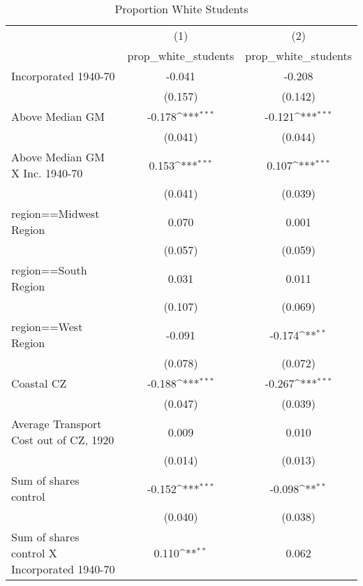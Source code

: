 \begin{table}[htbp]\centering
\def\sym#1{\ifmmode^{#1}\else\(^{#1}\)\fi}
\caption{Proportion White Students}
\begin{tabular}{l*{2}{c}}
\hline\hline
                    &\multicolumn{1}{c}{(1)}&\multicolumn{1}{c}{(2)}\\
                    &\multicolumn{1}{c}{prop\_white\_students}&\multicolumn{1}{c}{prop\_white\_students}\\
\hline
Incorporated 1940-70&      -0.041         &      -0.208         \\
                    &     (0.157)         &     (0.142)         \\
[1em]
Above Median GM     &      -0.178\sym{***}&      -0.121\sym{***}\\
                    &     (0.041)         &     (0.044)         \\
[1em]
Above Median GM X Inc. 1940-70&       0.153\sym{***}&       0.107\sym{***}\\
                    &     (0.041)         &     (0.039)         \\
[1em]
region==Midwest Region&       0.070         &       0.001         \\
                    &     (0.057)         &     (0.059)         \\
[1em]
region==South Region&       0.031         &       0.011         \\
                    &     (0.107)         &     (0.069)         \\
[1em]
region==West Region &      -0.091         &      -0.174\sym{**} \\
                    &     (0.078)         &     (0.072)         \\
[1em]
Coastal CZ          &      -0.188\sym{***}&      -0.267\sym{***}\\
                    &     (0.047)         &     (0.039)         \\
[1em]
Average Transport Cost out of CZ, 1920&       0.009         &       0.010         \\
                    &     (0.014)         &     (0.013)         \\
[1em]
Sum of shares control&      -0.152\sym{***}&      -0.098\sym{**} \\
                    &     (0.040)         &     (0.038)         \\
[1em]
Sum of shares control X Incorporated 1940-70&       0.110\sym{**} &       0.062         \\

\end{tabular}
\end{table}
